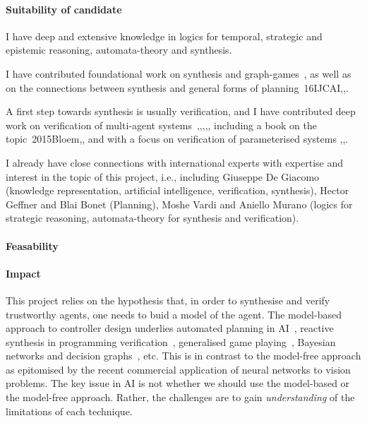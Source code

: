\documentclass[a4paper,12pt,smallheadings]{scrartcl}
\begin{document}


\paragraph{Suitability of candidate}

I have deep and extensive knowledge in logics for temporal, strategic and epistemic reasoning, automata-theory and synthesis. 

I have contributed foundational work on synthesis and graph-games~, as well as 
on the connections between synthesis and general forms of planning~\GMRS16IJCAI,\BDGRICAPS,. 

A first step towards synthesis is usually verification, and I have contributed deep work on verification of multi-agent systems~,,,,, including a book on the topic~\DBLPseriessynthesis2015Bloem,, and with a focus on verification of parameterised systems ,,.

I already have close connections with international experts with expertise and interest in the topic of this project, i.e., 
including Giuseppe De Giacomo (knowledge representation, artificial intelligence, verification, synthesis), Hector Geffner and Blai Bonet (Planning), Moshe Vardi and Aniello Murano (logics for strategic reasoning, automata-theory for synthesis and verification). 

\paragraph{Feasability} 
 

\paragraph{Impact}

This project relies on the hypothesis that, in order to synthesise and verify trustworthy agents, one needs to buid a model of the agent. The model-based approach to controller design underlies automated planning in AI~\cite{GeffnerBo13}, reactive synthesis in programming verification~\cite{DBLP:journals/jcss/BloemJPPS12}, generalised game playing~\cite{GGP}, Bayesian networks and decision graphs~\cite{Jensen2002}, etc. This is in contrast to the model-free approach as epitomised by the recent commercial application of neural networks to vision problems. The key issue in AI is not whether we should use the model-based or the model-free approach. Rather, the challenges are to gain \emph{understanding} of the limitations of each technique. 
\end{document}
